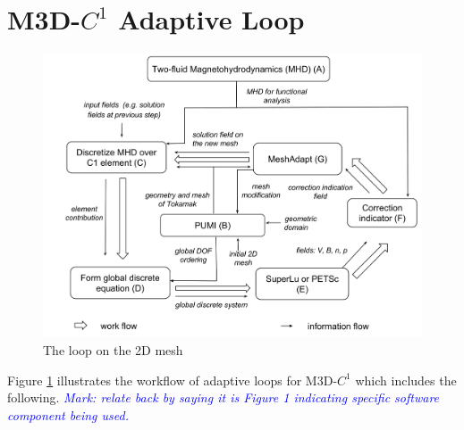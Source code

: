 \documentclass[11pt]{article}  %
\begin{document}
\section{M3D-$C^1$ Adaptive Loop}\label{sec:m3dc1}
\begin{figure}[hbt]
\center
\includegraphics[width=5.5in]{fig/M3DC1Loop.png}
\caption{\small{The loop on the 2D mesh}}
\label{fig:M3DC1Loop}
\end{figure}

Figure \ref{fig:M3DC1Loop} illustrates the workflow of adaptive loops for M3D-$C^1$ which includes the following. \textit{\textcolor{blue}{Mark: relate back by saying it is Figure 1 indicating specific software component being used.}}
\end{document}
